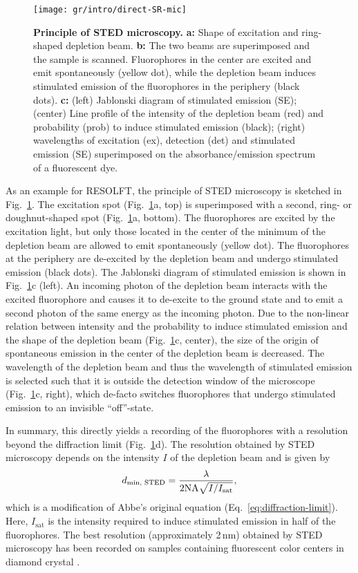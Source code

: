 \begin{figure}
  \centering
  \texttt{[image: gr/intro/direct-SR-mic]}
  \caption{\textbf{Principle of STED microscopy.} \textbf{a:} Shape of
    excitation and ring-shaped depletion beam. \textbf{b:} The two beams are
    superimposed and the sample is scanned. Fluorophores in the center are
    excited and emit spontaneously (yellow dot), while the depletion beam
    induces stimulated emission of the fluorophores in the periphery (black
    dots). \textbf{c:} (left) Jablonski diagram of stimulated emission (SE);
    (center) Line profile of the intensity of the depletion beam (red) and
    probability (prob) to induce stimulated emission (black); (right)
    wavelengths of excitation (ex), detection (det) and stimulated emission
    (SE) superimposed on the absorbance/emission spectrum of a fluorescent
    dye.}
  \label{fig:STED-principle}
\end{figure}

As an example for RESOLFT, the principle of STED microscopy is sketched in
Fig.~\ref{fig:STED-principle}. The excitation spot
(Fig.~\ref{fig:STED-principle}a, top) is superimposed with a second, ring- or
doughnut-shaped spot (Fig.~\ref{fig:STED-principle}a, bottom). The
fluorophores are excited by the excitation light, but only those located in
the center of the minimum of the depletion beam are allowed to emit
spontaneously (yellow dot). The fluorophores at the periphery are de-excited
by the depletion beam and undergo stimulated emission (black dots). The
Jablonski diagram of stimulated emission is shown in
Fig.~\ref{fig:STED-principle}c (left). An incoming photon of the depletion
beam interacts with the excited fluorophore and causes it to de-excite to the
ground state and to emit a second photon of the same energy as the incoming
photon. Due to the non-linear relation between intensity and the probability
to induce stimulated emission and the shape of the depletion beam
(Fig.~\ref{fig:STED-principle}c, center), the size of the origin of
spontaneous emission in the center of the depletion beam is decreased. The
wavelength of the depletion beam and thus the wavelength of stimulated
emission is selected such that it is outside the detection window of the
microscope (Fig.~\ref{fig:STED-principle}c, right), which de-facto switches
fluorophores that undergo stimulated emission to an invisible ``off''-state.

In summary, this directly yields a recording of the fluorophores with a
resolution beyond the diffraction limit (Fig.~\ref{fig:STED-principle}d). The
resolution obtained by STED microscopy depends on the intensity $I$ of the
depletion beam and is given by
\begin{equation}
  d_\text{min, STED} = \frac\lambda{2\mathrm{NA}\sqrt{I/I_\text{sat}}}\text,
  \label{eq:resolution-STED}
\end{equation}
which is a modification of Abbe's original equation
(Eq.~\ref{eq:diffraction-limit}). Here, $I_\text{sat}$ is the intensity
required to induce stimulated emission in half of the fluorophores. The best resolution (approximately 2\,nm) obtained by STED microscopy has
been recorded on samples containing fluorescent color centers in diamond
crystal \cite{Wildanger2012}.

